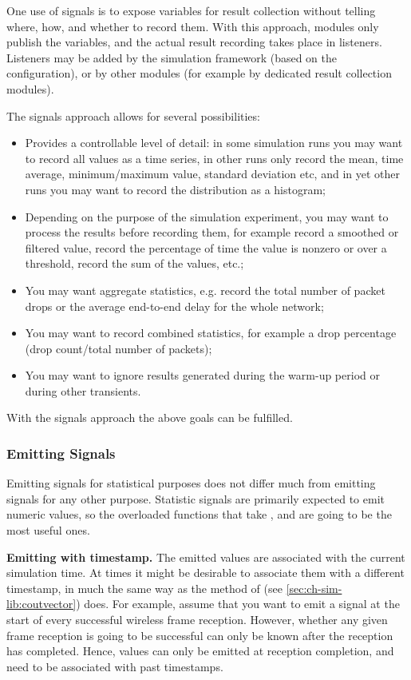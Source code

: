 One use of signals is to expose variables for result collection without
telling where, how, and whether to record them. With this approach,
modules only publish the variables, and the actual result recording
takes place in listeners. Listeners may be added by the simulation
framework (based on the configuration), or by other modules (for example
by dedicated result collection modules).

The signals approach allows for several possibilities:

\begin{itemize}
 \item Provides a controllable level of detail: in some simulation runs
    you may want to record all values as a time series, in other runs
    only record the mean, time average, minimum/maximum value, standard
    deviation etc, and in yet other runs you may want to record the
    distribution as a histogram;
 \item Depending on the purpose of the simulation experiment, you may want
    to process the results before recording them, for example
    record a smoothed or filtered value, record the percentage of time the
    value is nonzero or over a threshold, record the sum of the values, etc.;
 \item You may want aggregate statistics, e.g. record the total number
    of packet drops or the average end-to-end delay for the whole network;
 \item You may want to record combined statistics, for example a drop
    percentage (drop count/total number of packets);
 \item You may want to ignore results generated during the warm-up period
    or during other transients.
\end{itemize}

With the signals approach the above goals can be fulfilled.


\subsubsection{Emitting Signals}

Emitting signals for statistical purposes does not differ much from
emitting signals for any other purpose. Statistic signals are primarily
expected to emit numeric values, so the overloaded  functions
that take ,  and  are going to be the
most useful ones.

\textbf{Emitting with timestamp.} The emitted values are associated with
the current simulation time. At times it might be desirable to associate
them with a different timestamp, in much the same way as the
 method of  (see
\ref{sec:ch-sim-lib:coutvector}) does. For example, assume that you want to
emit a signal at the start of every successful wireless frame reception.
However, whether any given frame reception is going to be successful can
only be known after the reception has completed. Hence, values can only be
emitted at reception completion, and need to be associated with past
timestamps.

